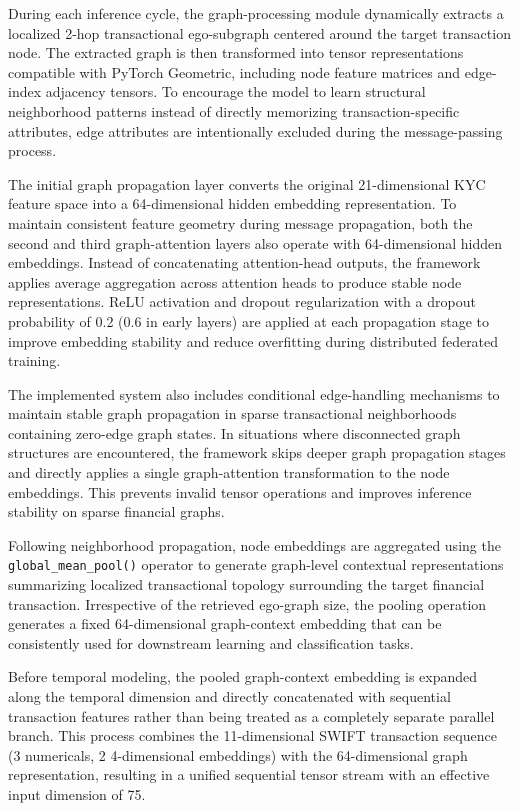 \documentclass[conference]{IEEEtran}
\begin{document}
During each inference cycle, the graph-processing module dynamically extracts a localized 2-hop transactional ego-subgraph centered around the target transaction node. The extracted graph is then transformed into tensor representations compatible with PyTorch Geometric, including node feature matrices and edge-index adjacency tensors. To encourage the model to learn structural neighborhood patterns instead of directly memorizing transaction-specific attributes, edge attributes are intentionally excluded during the message-passing process.

The initial graph propagation layer converts the original 21-dimensional KYC feature space into a 64-dimensional hidden embedding representation. To maintain consistent feature geometry during message propagation, both the second and third graph-attention layers also operate with 64-dimensional hidden embeddings. Instead of concatenating attention-head outputs, the framework applies average aggregation across attention heads to produce stable node representations. ReLU activation and dropout regularization with a dropout probability of 0.2 (0.6 in early layers) are applied at each propagation stage to improve embedding stability and reduce overfitting during distributed federated training.

The implemented system also includes conditional edge-handling mechanisms to maintain stable graph propagation in sparse transactional neighborhoods containing zero-edge graph states. In situations where disconnected graph structures are encountered, the framework skips deeper graph propagation stages and directly applies a single graph-attention transformation to the node embeddings. This prevents invalid tensor operations and improves inference stability on sparse financial graphs.

Following neighborhood propagation, node embeddings are aggregated using the \texttt{global\_mean\_pool()} operator to generate graph-level contextual representations summarizing localized transactional topology surrounding the target financial transaction. Irrespective of the retrieved ego-graph size, the pooling operation generates a fixed 64-dimensional graph-context embedding that can be consistently used for downstream learning and classification tasks.

Before temporal modeling, the pooled graph-context embedding is expanded along the temporal dimension and directly concatenated with sequential transaction features rather than being treated as a completely separate parallel branch. This process combines the 11-dimensional SWIFT transaction sequence (3 numericals, 2 4-dimensional embeddings) with the 64-dimensional graph representation, resulting in a unified sequential tensor stream with an effective input dimension of 75.
\end{document}
